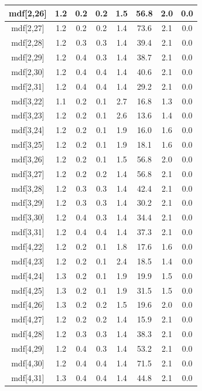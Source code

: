 \begin{longtable}{|c|c|c|c|c|c|c|c|}
\hline
mdf[2,26] & 1.2 & 0.2 & 0.2 & 1.5 & 56.8 & 2.0 & 0.0 \\
\hline
mdf[2,27] & 1.2 & 0.2 & 0.2 & 1.4 & 73.6 & 2.1 & 0.0 \\
\hline
mdf[2,28] & 1.2 & 0.3 & 0.3 & 1.4 & 39.4 & 2.1 & 0.0 \\
\hline
mdf[2,29] & 1.2 & 0.4 & 0.3 & 1.4 & 38.7 & 2.1 & 0.0 \\
\hline
mdf[2,30] & 1.2 & 0.4 & 0.4 & 1.4 & 40.6 & 2.1 & 0.0 \\
\hline
mdf[2,31] & 1.2 & 0.4 & 0.4 & 1.4 & 29.2 & 2.1 & 0.0 \\
\hline
mdf[3,22] & 1.1 & 0.2 & 0.1 & 2.7 & 16.8 & 1.3 & 0.0 \\
\hline
mdf[3,23] & 1.2 & 0.2 & 0.1 & 2.6 & 13.6 & 1.4 & 0.0 \\
\hline
mdf[3,24] & 1.2 & 0.2 & 0.1 & 1.9 & 16.0 & 1.6 & 0.0 \\
\hline
mdf[3,25] & 1.2 & 0.2 & 0.1 & 1.9 & 18.1 & 1.6 & 0.0 \\
\hline
mdf[3,26] & 1.2 & 0.2 & 0.1 & 1.5 & 56.8 & 2.0 & 0.0 \\
\hline
mdf[3,27] & 1.2 & 0.2 & 0.2 & 1.4 & 56.8 & 2.1 & 0.0 \\
\hline
mdf[3,28] & 1.2 & 0.3 & 0.3 & 1.4 & 42.4 & 2.1 & 0.0 \\
\hline
mdf[3,29] & 1.2 & 0.3 & 0.3 & 1.4 & 30.2 & 2.1 & 0.0 \\
\hline
mdf[3,30] & 1.2 & 0.4 & 0.3 & 1.4 & 34.4 & 2.1 & 0.0 \\
\hline
mdf[3,31] & 1.2 & 0.4 & 0.4 & 1.4 & 37.3 & 2.1 & 0.0 \\
\hline
mdf[4,22] & 1.2 & 0.2 & 0.1 & 1.8 & 17.6 & 1.6 & 0.0 \\
\hline
mdf[4,23] & 1.2 & 0.2 & 0.1 & 2.4 & 18.5 & 1.4 & 0.0 \\
\hline
mdf[4,24] & 1.3 & 0.2 & 0.1 & 1.9 & 19.9 & 1.5 & 0.0 \\
\hline
mdf[4,25] & 1.3 & 0.2 & 0.1 & 1.9 & 31.5 & 1.5 & 0.0 \\
\hline
mdf[4,26] & 1.3 & 0.2 & 0.2 & 1.5 & 19.6 & 2.0 & 0.0 \\
\hline
mdf[4,27] & 1.2 & 0.2 & 0.2 & 1.4 & 15.9 & 2.1 & 0.0 \\
\hline
mdf[4,28] & 1.2 & 0.3 & 0.3 & 1.4 & 38.3 & 2.1 & 0.0 \\
\hline
mdf[4,29] & 1.2 & 0.4 & 0.3 & 1.4 & 53.2 & 2.1 & 0.0 \\
\hline
mdf[4,30] & 1.2 & 0.4 & 0.4 & 1.4 & 71.5 & 2.1 & 0.0 \\
\hline
mdf[4,31] & 1.3 & 0.4 & 0.4 & 1.4 & 44.8 & 2.1 & 0.0 \\

\end{longtable}
